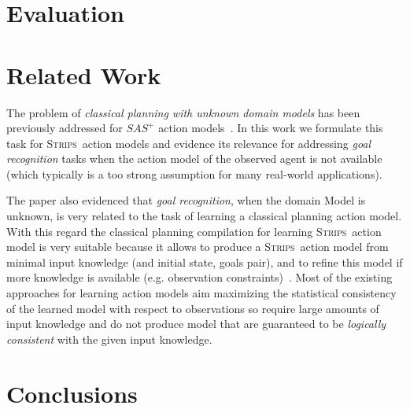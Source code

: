 \documentclass{article}
\newcommand{\strips}{\textsc{Strips}}
\begin{document}
\section{Evaluation}
\label{sec:evaluation}

\section{Related Work}
\label{sec:evaluation}
The problem of {\em classical planning with unknown domain models} has been previously addressed for $SAS^+$ action models~\cite{SternJ17}. In this work we formulate this task for \strips\ action models and evidence its relevance for addressing {\em goal recognition} tasks when the action model of the observed agent is not available (which typically is a too strong  assumption for many real-world applications).   

The paper also evidenced that {\em goal recognition}, when the domain Model is unknown, is very related to the task of learning a classical planning action model. With this regard the classical planning compilation for learning \strips\ action model is very suitable because it allows to produce a \strips\ action model from minimal input knowledge (and initial state, goals pair), and to refine this model if more knowledge is available (e.g. observation constraints)~\cite{aineto2018learning}. Most of the existing approaches for learning action models aim maximizing the statistical consistency of the learned model with respect to observations so require large amounts of input knowledge and do not produce model that are guaranteed to be {\em logically consistent} with the given input knowledge. 


\section{Conclusions}
\label{sec:conclusions}




\end{document}
